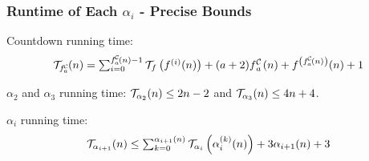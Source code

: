 \begin{frame}
\frametitle{Runtime of Each $\alpha_i$ - Precise Bounds}

Countdown running time:
\begin{equation*}
\textstyle \runtime_{\cdt{f}{a}}(n) =
\sum_{i=0}^{\cdt{f}{a}(n) - 1} \runtime_f\left(f^{(i)}(n)\right)
+ (a + 2)\cdt{f}{a}(n) + f^{\left(\cdt{f}{a}(n)\right)}(n) + 1
\end{equation*}

\smallskip

\pause 
$\alpha_2$ and $\alpha_3$ running time: $\mathcal{T}_{\alpha_2}(n) \le 2n - 2$ and $\mathcal{T}_{\alpha_3}(n) \le 4n + 4$.

\bigskip 

\pause 
$\alpha_i$ running time:
\begin{equation*}
\textstyle \mathcal{T}_{\alpha_{i+1}}(n) \le \sum_{k=0}^{\alpha_{i+1}(n)}\mathcal{T}_{\alpha_i}\left( \alpha_i^{(k)}(n)\right) + 3\alpha_{i+1}(n) + 3
\end{equation*}

\smallskip

\pause 
{}

\end{frame}



